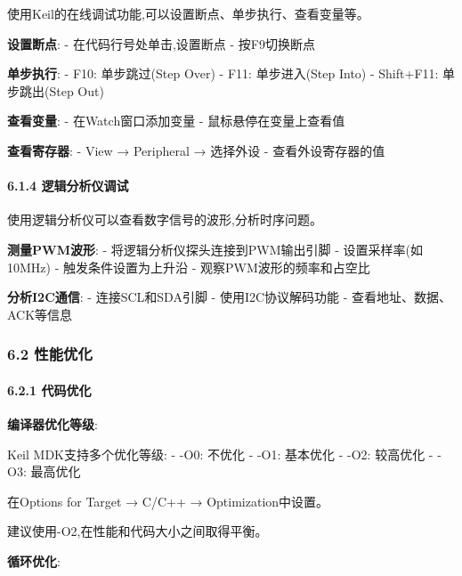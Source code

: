 \documentclass[
]{article}
\begin{document}
使用Keil的在线调试功能,可以设置断点、单步执行、查看变量等。

\textbf{设置断点}: - 在代码行号处单击,设置断点 - 按F9切换断点

\textbf{单步执行}: - F10: 单步跳过(Step Over) - F11: 单步进入(Step Into)
- Shift+F11: 单步跳出(Step Out)

\textbf{查看变量}: - 在Watch窗口添加变量 - 鼠标悬停在变量上查看值

\textbf{查看寄存器}: - View → Peripheral → 选择外设 - 查看外设寄存器的值

\hypertarget{ux903bux8f91ux5206ux6790ux4eeaux8c03ux8bd5}{%
\paragraph{6.1.4
逻辑分析仪调试}\label{ux903bux8f91ux5206ux6790ux4eeaux8c03ux8bd5}}

使用逻辑分析仪可以查看数字信号的波形,分析时序问题。

\textbf{测量PWM波形}: - 将逻辑分析仪探头连接到PWM输出引脚 -
设置采样率(如10MHz) - 触发条件设置为上升沿 - 观察PWM波形的频率和占空比

\textbf{分析I2C通信}: - 连接SCL和SDA引脚 - 使用I2C协议解码功能 -
查看地址、数据、ACK等信息

\hypertarget{ux6027ux80fdux4f18ux5316}{%
\subsubsection{6.2 性能优化}\label{ux6027ux80fdux4f18ux5316}}

\hypertarget{ux4ee3ux7801ux4f18ux5316}{%
\paragraph{6.2.1 代码优化}\label{ux4ee3ux7801ux4f18ux5316}}

\textbf{编译器优化等级}:

Keil MDK支持多个优化等级: - -O0: 不优化 - -O1: 基本优化 - -O2: 较高优化
- -O3: 最高优化

在Options for Target → C/C++ → Optimization中设置。

建议使用-O2,在性能和代码大小之间取得平衡。

\textbf{循环优化}:
\end{document}
